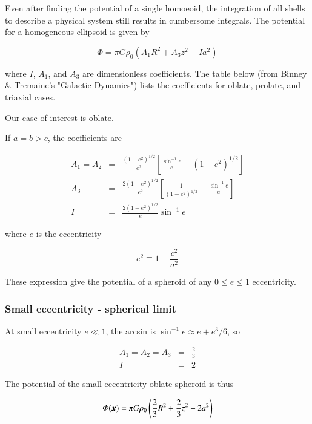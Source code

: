 Even after finding the potential of a single homoeoid, the integration of all shells to describe a physical system still results in cumbersome integrals. The potential for a homogeneous ellipsoid is given by

\begin{equation}
\varPhi = \pi G \rho_0 \left(A_1 R^2 + A_3 z^2 - Ia^2 \right) 
\end{equation}

where $I$, $A_1$, and $A_3$ are dimensionless coefficients. The table below (from Binney \& Tremaine's "Galactic Dynamics") lists the coefficients for oblate, prolate, and triaxial cases. 


Our case of interest is oblate.

If $a=b > c$, the coefficients are 

\begin{eqnarray}
A_1 = A_2 &=& \frac{(1-e^2)^{1/2}}{e^2}\left[\frac{\sin^{-1} e}{e} -(1-e^2)^{1/2}\right]\\
A_3&=&\frac{2(1-e^2)^{1/2}}{e^2}\left[\frac{1}{(1-e^2)^{1/2}} - \frac{\sin^{-1} e}{e}\right]\\
I &=& \frac{2(1-e^2)^{1/2}}{e}\sin^{-1} e
\end{eqnarray}

where $e$ is the eccentricity

\begin{equation}
e^2\equiv 1-\frac{c^2}{a^2} 
\end{equation}


These expression give the potential of a spheroid of any $0\leq e \leq 1$ eccentricity.


\subsubsection{Small eccentricity - spherical limit}

At small eccentricity $e \ll 1$, the arcsin is $\sin^{-1} e \approx e + e^3/6$, so 

\begin{eqnarray}
A_1=A_2=A_3 &=& \frac{2}{3}\\
I &=& 2
\end{eqnarray}

The potential of the small eccentricity oblate spheroid is thus 

\begin{equation}
\varPhi({\boldsymbol{x}}) = \pi G \rho_0 \left(\frac{2}{3} R^2 + \frac{2}{3} z^2 - 2a^2 \right) 
\end{equation}

